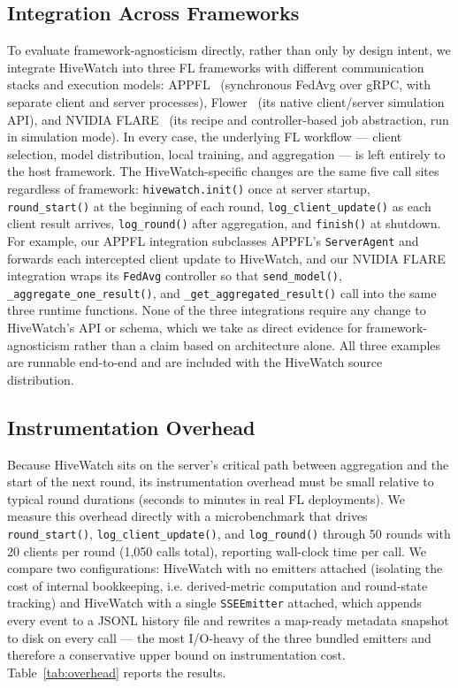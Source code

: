 
\subsection{Integration Across Frameworks}
\label{subsec:integration}

To evaluate framework-agnosticism directly, rather than only by design intent, we integrate HiveWatch into three FL frameworks with different communication stacks and execution models: APPFL~\cite{ryu2022appfl, li2025advances} (synchronous FedAvg over gRPC, with separate client and server processes), Flower~\cite{beutel2020flower} (its native client/server simulation API), and NVIDIA FLARE~\cite{roth2022nvidia} (its recipe and controller-based job abstraction, run in simulation mode). In every case, the underlying FL workflow — client selection, model distribution, local training, and aggregation — is left entirely to the host framework. The HiveWatch-specific changes are the same five call sites regardless of framework: \texttt{hivewatch.init()} once at server startup, \texttt{round\_start()} at the beginning of each round, \texttt{log\_client\_update()} as each client result arrives, \texttt{log\_round()} after aggregation, and \texttt{finish()} at shutdown. For example, our APPFL integration subclasses APPFL's \texttt{ServerAgent} and forwards each intercepted client update to HiveWatch, and our NVIDIA FLARE integration wraps its \texttt{FedAvg} controller so that \texttt{send\_model()}, \texttt{\_aggregate\_one\_result()}, and \texttt{\_get\_aggregated\_result()} call into the same three runtime functions. None of the three integrations require any change to HiveWatch's API or schema, which we take as direct evidence for framework-agnosticism rather than a claim based on architecture alone. All three examples are runnable end-to-end and are included with the HiveWatch source distribution.

\subsection{Instrumentation Overhead}
\label{subsec:overhead}

Because HiveWatch sits on the server's critical path between aggregation and the start of the next round, its instrumentation overhead must be small relative to typical round durations (seconds to minutes in real FL deployments). We measure this overhead directly with a microbenchmark that drives \texttt{round\_start()}, \texttt{log\_client\_update()}, and \texttt{log\_round()} through 50 rounds with 20 clients per round (1{,}050 calls total), reporting wall-clock time per call. We compare two configurations: HiveWatch with no emitters attached (isolating the cost of internal bookkeeping, i.e. derived-metric computation and round-state tracking) and HiveWatch with a single \texttt{SSEEmitter} attached, which appends every event to a JSONL history file and rewrites a map-ready metadata snapshot to disk on every call — the most I/O-heavy of the three bundled emitters and therefore a conservative upper bound on instrumentation cost. Table~\ref{tab:overhead} reports the results.

